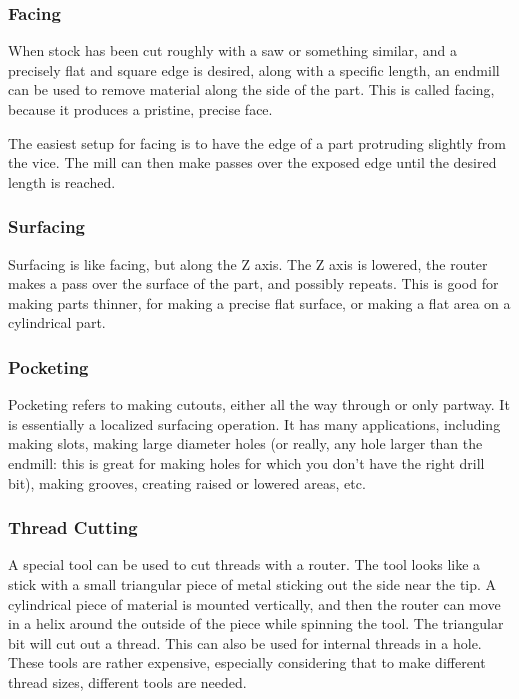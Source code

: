 \documentclass[a4paper,11pt]{article}
\begin{document}
\subsubsection{Facing}
When stock has been cut roughly with a saw or something similar, and a precisely flat and square edge is desired, along with a specific length, an endmill can be used to remove material along the side of the part. This is called facing, because it produces a pristine, precise face. 

The easiest setup for facing is to have the edge of a part protruding slightly from the vice. The mill can then make passes over the exposed edge until the desired length is reached.

\subsubsection{Surfacing}
Surfacing is like facing, but along the Z axis. The Z axis is lowered, the router makes a pass over the surface of the part, and possibly repeats. This is good for making parts thinner, for making a precise flat surface, or making a flat area on a cylindrical part. 

\subsubsection{Pocketing}
Pocketing refers to making cutouts, either all the way through or only partway. It is essentially a localized surfacing operation. It has many applications, including making slots, making large diameter holes (or really, any hole larger than the endmill: this is great for making holes for which you don't have the right drill bit), making grooves, creating raised or lowered areas, etc.


\subsubsection{Thread Cutting}
A special tool can be used to cut threads with a router. The tool looks like a stick with a small triangular piece of metal sticking out the side near the tip. A cylindrical piece of material is mounted vertically, and then the router can move in a helix around the outside of the piece while spinning the tool. The triangular bit will cut out a thread. This can also be used for internal threads in a hole. These tools are rather expensive, especially considering that to make different thread sizes, different tools are needed. 
\end{document}
